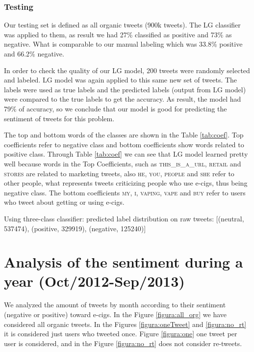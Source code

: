 \documentclass{sig-alternate}
\begin{document}

\subsubsection{Testing}
\label{sec:test}
Our testing set is defined as all organic tweets (900k tweets). The LG classifier was applied to them, as result we had 27\% classified as positive and 73\% as negative. What is comparable to our manual labeling which was 33.8\% positive and 66.2\% negative. 

In order to check the quality of our LG model, 200 tweets were randomly selected and labeled. LG model was again applied to this same new set of tweets. The labels were used as true labels and the predicted labels (output from LG model) were compared to the true labels to get the accuracy. As result, the model had 79\% of accuracy, so we conclude that our model is good for predicting the sentiment of tweets for this problem.

The top and bottom words of the classes are shown in the Table \ref{tab:coef}. Top coefficients refer to negative class and bottom coefficients show words related to positive class. Through Table \ref{tab:coef} we can see that LG model learned pretty well because words in the Top Coefficients, such as \textsc{this\_is\_a\_url}, \textsc{retail} and \textsc{stores} are related to marketing tweets, also \textsc{he}, \textsc{you}, \textsc{people} and \textsc{she} refer to other people, what represents tweets criticizing people who use e-cigs, thus being negative class. The bottom coefficients \textsc{my}, \textsc{i}, \textsc{vaping}, \textsc{vape} and \textsc{buy} refer to users who tweet about getting or using e-cigs.



Using three-class classifier: predicted label distribution on raw tweets: [(neutral, 537474), (positive, 329919), (negative, 125240)]


\section{Analysis of the sentiment during a year (Oct/2012-Sep/2013)}

We analyzed the amount of tweets by month according to their sentiment (negative or positive) toward e-cigs. In the Figure \ref{figura:all_org} we have considered all organic tweets. In the Figures \ref{figura:oneTweet} and \ref{figura:no_rt} it is considered just users who tweeted once. Figure \ref{figura:one} one tweet per user is considered, and in the Figure \ref{figura:no_rt} does not consider re-tweets.
\end{document}
